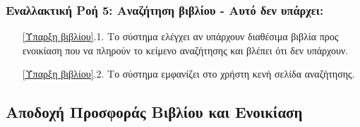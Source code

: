 \documentclass[12pt,a4paper]{article}
\begin{document}
\subsubsection*{Εναλλακτική Ροή 5: Αναζήτηση βιβλίου - Αυτό δεν υπάρχει:}
\begin{enumerate}
    \item[\ref{Ύπαρξη βιβλίου}.1.] Το σύστημα ελέγχει αν υπάρχουν διαθέσιμα βιβλία προς ενοικίαση που να πληρούν το κείμενο αναζήτησης και βλέπει ότι δεν υπάρχουν.
    \item[\ref{Ύπαρξη βιβλίου}.2.] Το σύστημα εμφανίζει στο χρήστη κενή σελίδα αναζήτησης.
\end{enumerate}

\subsection{Αποδοχή Προσφοράς Βιβλίου και Ενοικίαση}
\label{Rental Use Case}
\end{document}
